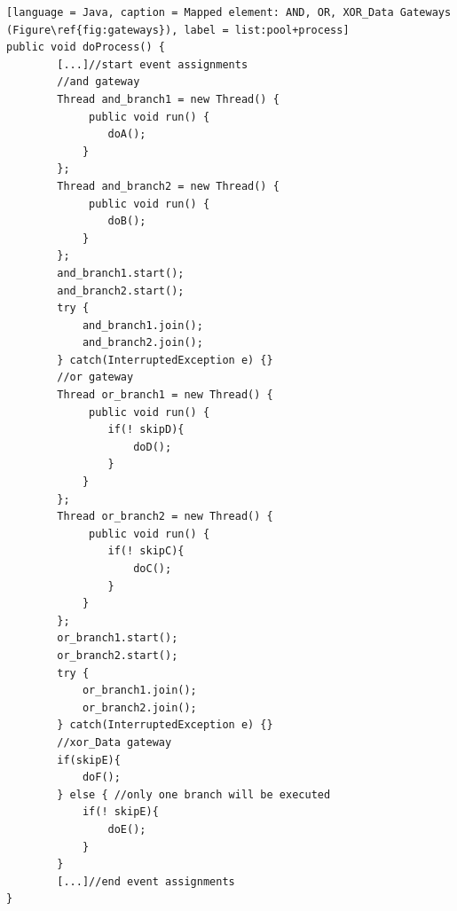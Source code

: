 \begin{lstlisting}[language = Java, caption = Mapped element: AND, OR, XOR_Data Gateways (Figure\ref{fig:gateways}), label = list:pool+process]
public void doProcess() {
		[...]//start event assignments
		//and gateway
		Thread and_branch1 = new Thread() {
			 public void run() {
				doA();
			}
		};
		Thread and_branch2 = new Thread() {
			 public void run() {
				doB();
			}
		};
		and_branch1.start();
		and_branch2.start();
		try {
			and_branch1.join();
			and_branch2.join();
		} catch(InterruptedException e) {}
		//or gateway
		Thread or_branch1 = new Thread() {
			 public void run() {
				if(! skipD){
					doD();
				}
			}
		};
		Thread or_branch2 = new Thread() {
			 public void run() {
				if(! skipC){
					doC();
				}
			}
		};
		or_branch1.start();
		or_branch2.start();
		try {
			or_branch1.join();
			or_branch2.join();
		} catch(InterruptedException e) {}
		//xor_Data gateway
		if(skipE){
			doF();
		} else { //only one branch will be executed
			if(! skipE){
				doE();
			}
		}
		[...]//end event assignments
}
\end{lstlisting}